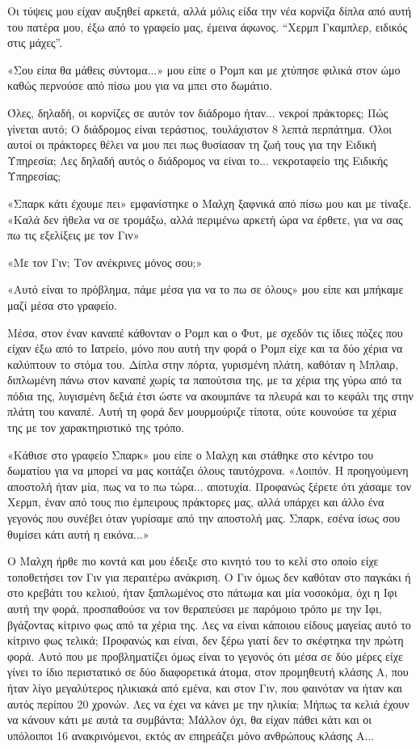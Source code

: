 \documentclass[12pt,twoside, openany]{book}
\begin{document}
Οι τύψεις μου είχαν αυξηθεί αρκετά, αλλά μόλις είδα την νέα κορνίζα δίπλα από αυτή του πατέρα μου, έξω από το γραφείο μας, έμεινα άφωνος. “Χερμπ Γκαμπλερ, ειδικός στις μάχες”.

«Σου είπα θα μάθεις σύντομα...» μου είπε ο Ρομπ και με χτύπησε φιλικά στον ώμο καθώς περνούσε από πίσω μου για να μπει στο δωμάτιο.

Όλες, δηλαδή, οι κορνίζες σε αυτόν τον διάδρομο ήταν... νεκροί πράκτορες; Πώς γίνεται αυτό; Ο διάδρομος είναι τεράστιος, τουλάχιστον 8 λεπτά περπάτημα. Όλοι αυτοί οι πράκτορες θέλει να μου πει πως θυσίασαν τη ζωή τους για την Ειδική Υπηρεσία; Λες δηλαδή αυτός ο διάδρομος να είναι το... νεκροταφείο της Ειδικής Υπηρεσίας;

«Σπαρκ κάτι έχουμε πει» εμφανίστηκε ο Μαλχη ξαφνικά από πίσω μου και με τίναξε. «Καλά δεν ήθελα να σε τρομάξω, αλλά περιμένω αρκετή ώρα να έρθετε, για να σας πω τις εξελίξεις με τον Γιν»

«Με τον Γιν; Τον ανέκρινες μόνος σου;»

«Αυτό είναι το πρόβλημα, πάμε μέσα για να το πω σε όλους» μου είπε και μπήκαμε μαζί μέσα στο γραφείο.

Μέσα, στον έναν καναπέ κάθονταν ο Ρομπ και ο Φυτ, με σχεδόν τις ίδιες πόζες που είχαν έξω από το Ιατρείο, μόνο που αυτή την φορά ο Ρομπ είχε και τα δύο χέρια να καλύπτουν το στόμα του. Δίπλα στην πόρτα, γυρισμένη πλάτη, καθόταν η Μπλαιρ, διπλωμένη πάνω στον καναπέ χωρίς τα παπούτσια της, με τα χέρια της γύρω από τα πόδια της, λυγισμένη δεξιά έτσι ώστε να ακουμπάνε τα πλευρά και το κεφάλι της στην πλάτη του καναπέ. Αυτή τη φορά δεν μουρμούριζε τίποτα, ούτε κουνούσε τα χέρια της με τον χαρακτηριστικό της τρόπο.

«Κάθισε στο γραφείο Σπαρκ» μου είπε ο Μαλχη και στάθηκε στο κέντρο του δωματίου για να μπορεί να μας κοιτάζει όλους ταυτόχρονα. «Λοιπόν. Η προηγούμενη αποστολή ήταν μία, πως να το πω τώρα... αποτυχία. Προφανώς ξέρετε ότι χάσαμε τον Χερμπ, έναν από τους πιο έμπειρους πράκτορες μας, αλλά υπάρχει και άλλο ένα γεγονός που συνέβει όταν γυρίσαμε από την αποστολή μας. Σπαρκ, εσένα ίσως σου θυμίσει κάτι αυτή η εικόνα...»

Ο Μαλχη ήρθε πιο κοντά και μου έδειξε στο κινητό του το κελί στο οποίο είχε τοποθετήσει τον Γιν για περαιτέρω ανάκριση. Ο Γιν όμως δεν καθόταν στο παγκάκι ή στο κρεβάτι του κελιού, ήταν ξαπλωμένος στο πάτωμα και μία νοσοκόμα, όχι η Ιφι αυτή την φορά, προσπαθούσε να τον θεραπεύσει με παρόμοιο τρόπο με την Ιφι, βγάζοντας κίτρινο φως από τα χέρια της. Λες να είναι κάποιου είδους μαγείας αυτό το κίτρινο φως τελικά; Προφανώς και είναι, δεν ξέρω γιατί δεν το σκέφτηκα την πρώτη φορά. Αυτό που με προβληματίζει όμως είναι το γεγονός ότι μέσα σε δύο μέρες είχε γίνει το ίδιο περιστατικό σε δύο διαφορετικά άτομα, στον προμηθευτή κλάσης Α, που ήταν λίγο μεγαλύτερος ηλικιακά από εμένα, και στον Γιν, που φαινόταν να ήταν και αυτός περίπου 20 χρονών. Λες να έχει να κάνει με την ηλικία; Μήπως τα κελιά έχουν να κάνουν κάτι με αυτά τα συμβάντα; Μάλλον όχι, θα είχαν πάθει κάτι και οι υπόλοιποι 16 ανακρινόμενοι, εκτός αν επηρεάζει μόνο ανθρώπους κλάσης Α...
\end{document}
